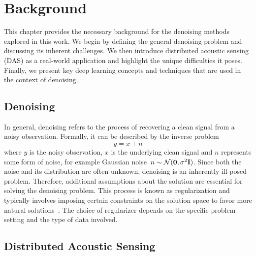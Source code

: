 \chapter{Background}\label{ch:background}

This chapter provides the necessary background for the denoising methods explored in this work.
We begin by defining the general denoising problem and discussing its inherent challenges.
We then introduce distributed acoustic sensing (DAS) as a real-world application and highlight the unique difficulties 
it poses.
Finally, we present key deep learning concepts and techniques that are used in the context of denoising.

\section{Denoising}

In general, denoising refers to the process of recovering a clean signal from a noisy observation.
Formally, it can be described by the inverse problem 
\begin{equation}
    y = x + n
\end{equation}
where $y$ is the noisy observation, $x$ is the underlying clean signal and $n$ represents some form of noise, for
example Gaussian noise~$n \sim \mathcal{N}(\mathbf{0},\sigma^2\mathbf{I})$.
Since both the noise and its distribution are often unknown, denoising is an inherently ill-posed problem.
Therefore, additional assumptions about the solution are essential for solving the denoising problem. 
This process is known as regularization and typically involves imposing certain constraints on the solution space to 
favor more natural solutions~\cite{XXX}. 
The choice of regularizer depends on the specific problem setting and the type of data involved.

\section{Distributed Acoustic Sensing}

